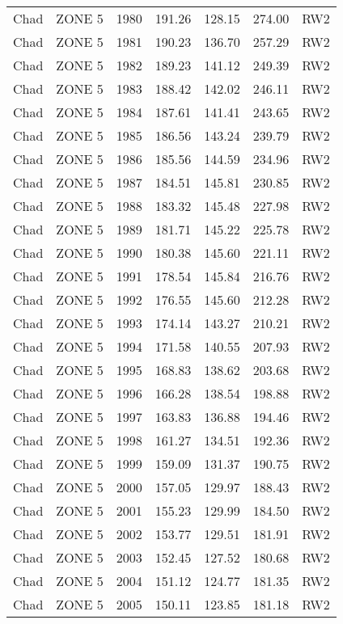 \begin{longtable}{lllrrrl}
  Chad & ZONE 5 & 1980 & 191.26 & 128.15 & 274.00 & RW2 \\ 
  Chad & ZONE 5 & 1981 & 190.23 & 136.70 & 257.29 & RW2 \\ 
  Chad & ZONE 5 & 1982 & 189.23 & 141.12 & 249.39 & RW2 \\ 
  Chad & ZONE 5 & 1983 & 188.42 & 142.02 & 246.11 & RW2 \\ 
  Chad & ZONE 5 & 1984 & 187.61 & 141.41 & 243.65 & RW2 \\ 
  Chad & ZONE 5 & 1985 & 186.56 & 143.24 & 239.79 & RW2 \\ 
  Chad & ZONE 5 & 1986 & 185.56 & 144.59 & 234.96 & RW2 \\ 
  Chad & ZONE 5 & 1987 & 184.51 & 145.81 & 230.85 & RW2 \\ 
  Chad & ZONE 5 & 1988 & 183.32 & 145.48 & 227.98 & RW2 \\ 
  Chad & ZONE 5 & 1989 & 181.71 & 145.22 & 225.78 & RW2 \\ 
  Chad & ZONE 5 & 1990 & 180.38 & 145.60 & 221.11 & RW2 \\ 
  Chad & ZONE 5 & 1991 & 178.54 & 145.84 & 216.76 & RW2 \\ 
  Chad & ZONE 5 & 1992 & 176.55 & 145.60 & 212.28 & RW2 \\ 
  Chad & ZONE 5 & 1993 & 174.14 & 143.27 & 210.21 & RW2 \\ 
  Chad & ZONE 5 & 1994 & 171.58 & 140.55 & 207.93 & RW2 \\ 
  Chad & ZONE 5 & 1995 & 168.83 & 138.62 & 203.68 & RW2 \\ 
  Chad & ZONE 5 & 1996 & 166.28 & 138.54 & 198.88 & RW2 \\ 
  Chad & ZONE 5 & 1997 & 163.83 & 136.88 & 194.46 & RW2 \\ 
  Chad & ZONE 5 & 1998 & 161.27 & 134.51 & 192.36 & RW2 \\ 
  Chad & ZONE 5 & 1999 & 159.09 & 131.37 & 190.75 & RW2 \\ 
  Chad & ZONE 5 & 2000 & 157.05 & 129.97 & 188.43 & RW2 \\ 
  Chad & ZONE 5 & 2001 & 155.23 & 129.99 & 184.50 & RW2 \\ 
  Chad & ZONE 5 & 2002 & 153.77 & 129.51 & 181.91 & RW2 \\ 
  Chad & ZONE 5 & 2003 & 152.45 & 127.52 & 180.68 & RW2 \\ 
  Chad & ZONE 5 & 2004 & 151.12 & 124.77 & 181.35 & RW2 \\ 
  Chad & ZONE 5 & 2005 & 150.11 & 123.85 & 181.18 & RW2 \\ 

\end{longtable}
